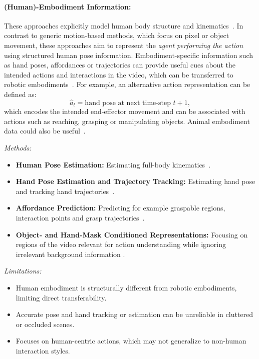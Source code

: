 \paragraph{(Human)-Embodiment Information:}

These approaches explicitly model human body structure and kinematics~\cite{McCarthy_2025, Bharadhwaj2023TowardsGZ, Shaw2022VideoDexLD, Bahl2023AffordancesFH, Qin2022FromOH, Qin2021DexMVIL}. 
In contrast to generic motion-based methods, which focus on pixel or object movement, these approaches aim to represent the \emph{agent performing the action} using structured human pose information. 
Embodiment-specific information such as hand poses, affordances or trajectories can provide useful cues about the intended actions and interactions in the video, which can be transferred to robotic embodiments~\cite{rong2020frankmocap, Shan2020UnderstandingHH}.
For example, an alternative action representation can be defined as:
\begin{equation}
    \hat{a}_t = \text{hand pose at next time-step } t+1,
\end{equation}
which encodes the intended end-effector movement and can be associated with actions such as reaching, grasping or manipulating objects. Animal embodiment data could also be useful~\cite{peng2020learning}.

\textit{Methods:}
\begin{itemize}
    \item \textbf{Human Pose Estimation:} Estimating full-body kinematics~\cite{Bharadhwaj2023TowardsGZ}.
    \item \textbf{Hand Pose Estimation and Trajectory Tracking:} Estimating hand pose and tracking hand trajectories~\cite{rong2020frankmocap, Shan2020UnderstandingHH}.
    \item \textbf{Affordance Prediction:} Predicting for example graspable regions, interaction points and grasp trajectories~\cite{Bahl2023AffordancesFH, Bharadhwaj2023TowardsGZ}.
    \item \textbf{Object- and Hand-Mask Conditioned Representations:} Focusing on regions of the video relevant for action understanding while ignoring irrelevant background information \cite{Bharadhwaj2023TowardsGZ}.
\end{itemize}

\textit{Limitations:}
\begin{itemize}
    \item Human embodiment is structurally different from robotic embodiments, limiting direct transferability.
    \item Accurate pose and hand tracking or estimation can be unreliable in cluttered or occluded scenes.
    \item Focuses on human-centric actions, which may not generalize to non-human interaction styles.
\end{itemize}




